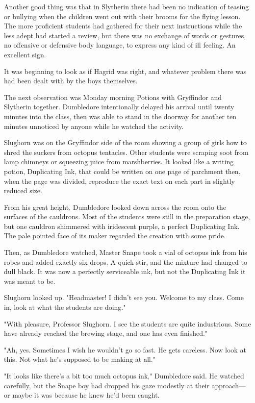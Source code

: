 Another good thing was that in Slytherin there had been no indication of teasing or bullying when the children went out with their brooms for the flying lesson. The more proficient students had gathered for their next instructions while the less adept had started a review, but there was no exchange of words or gestures, no offensive or defensive body language, to express any kind of ill feeling. An excellent sign.

It was beginning to look as if Hagrid was right, and whatever problem there was had been dealt with by the boys themselves.

The next observation was Monday morning Potions with Gryffindor and Slytherin together. Dumbledore intentionally delayed his arrival until twenty minutes into the class, then was able to stand in the doorway for another ten minutes unnoticed by anyone while he watched the activity.

Slughorn was on the Gryffindor side of the room showing a group of girls how to shred the suckers from octopus tentacles. Other students were scraping soot from lamp chimneys or squeezing juice from marshberries. It looked like a writing potion, Duplicating Ink, that could be written on one page of parchment then, when the page was divided, reproduce the exact text on each part in slightly reduced size.

From his great height, Dumbledore looked down across the room onto the surfaces of the cauldrons. Most of the students were still in the preparation stage, but one cauldron shimmered with iridescent purple, a perfect Duplicating Ink. The pale pointed face of its maker regarded the creation with some pride.

Then, as Dumbledore watched, Master Snape took a vial of octopus ink from his robes and added exactly six drops. A quick stir, and the mixture had changed to dull black. It was now a perfectly serviceable ink, but not the Duplicating Ink it was meant to be.

Slughorn looked up. "Headmaster! I didn't see you. Welcome to my class. Come in, look at what the students are doing."

"With pleasure, Professor Slughorn. I see the students are quite industrious. Some have already reached the brewing stage, and one has even finished."

"Ah, yes. Sometimes I wish he wouldn't go so fast. He gets careless. Now look at this. Not what he's supposed to be making at all."

"It looks like there's a bit too much octopus ink," Dumbledore said. He watched carefully, but the Snape boy had dropped his gaze modestly at their approach—or maybe it was because he knew he'd been caught.

